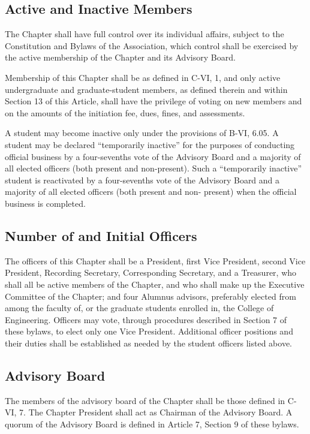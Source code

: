 \documentclass{article}
\begin{document}
	\subsection{Active and Inactive Members}
	The Chapter shall have full control over its individual affairs, subject to the Constitution and Bylaws of the Association, which control shall be exercised by the active membership of the Chapter and its Advisory Board.
	
	Membership of this Chapter shall be as defined in C-VI, 1, and only active undergraduate and graduate-student members, as defined therein and within Section 13 of this Article, shall have the privilege of voting on new members and on the amounts of the initiation fee, dues, fines, and assessments. %
	
	A student may become inactive only under the provisions of B-VI, 6.05. A student may be declared ``temporarily inactive'' for the purposes of conducting official business by a four-sevenths vote of the Advisory Board and a majority of all elected officers (both present and non-present). Such a ``temporarily inactive'' student is reactivated by a four-sevenths vote of the Advisory Board and a majority of all elected officers (both present and non- present) when the official business is completed.
	\subsection{Number of and Initial Officers}
	The officers of this Chapter shall be a President, first Vice President, second Vice President, Recording Secretary, Corresponding Secretary, and a Treasurer, who shall all be active members of the Chapter, and who shall make up the Executive Committee of the Chapter; and four Alumnus advisors, preferably elected from among the faculty of, or the graduate students enrolled in, the College of Engineering. Officers may vote, through procedures described in Section 7 of these bylaws, to elect only one Vice President. Additional officer positions and their duties shall be established as needed by the student officers listed above.
	\subsection{Advisory Board}
	The members of the advisory board of the Chapter shall be those defined in C-VI, 7. The Chapter President shall act as Chairman of the Advisory Board. A quorum of the Advisory Board is defined in Article 7, Section 9 of these bylaws.
	
\end{document}
